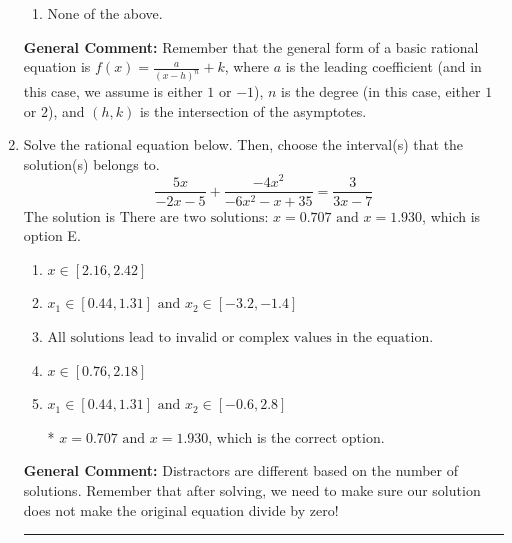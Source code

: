 \documentclass{extbook}[14pt]
\newcommand{\litem}[1]{\item #1

\rule{\textwidth}{0.4pt}}
\begin{document}
\begin{enumerate}
{\begin{enumerate}[label=\Alph*.]
\item None of the above.\end{enumerate}
\textbf{General Comment:} Remember that the general form of a basic rational equation is $ f(x) = \frac{a}{(x-h)^n} + k$, where $a$ is the leading coefficient (and in this case, we assume is either $1$ or $-1$), $n$ is the degree (in this case, either $1$ or $2$), and $(h, k)$ is the intersection of the asymptotes.
}
\litem{
Solve the rational equation below. Then, choose the interval(s) that the solution(s) belongs to.
\[ \frac{5x}{-2x -5} + \frac{-4x^{2}}{-6x^{2} -x + 35} = \frac{3}{3x -7} \]The solution is \( \text{There are two solutions: } x = 0.707 \text{ and } x = 1.930 \), which is option E.\begin{enumerate}[label=\Alph*.]
\item \( x \in [2.16,2.42] \)


\item \( x_1 \in [0.44, 1.31] \text{ and } x_2 \in [-3.2,-1.4] \)


\item \( \text{All solutions lead to invalid or complex values in the equation.} \)


\item \( x \in [0.76,2.18] \)


\item \( x_1 \in [0.44, 1.31] \text{ and } x_2 \in [-0.6,2.8] \)

* $x = 0.707 \text{ and } x = 1.930$, which is the correct option.
\end{enumerate}

\textbf{General Comment:} Distractors are different based on the number of solutions. Remember that after solving, we need to make sure our solution does not make the original equation divide by zero!
}
\end{enumerate}
\end{document}
